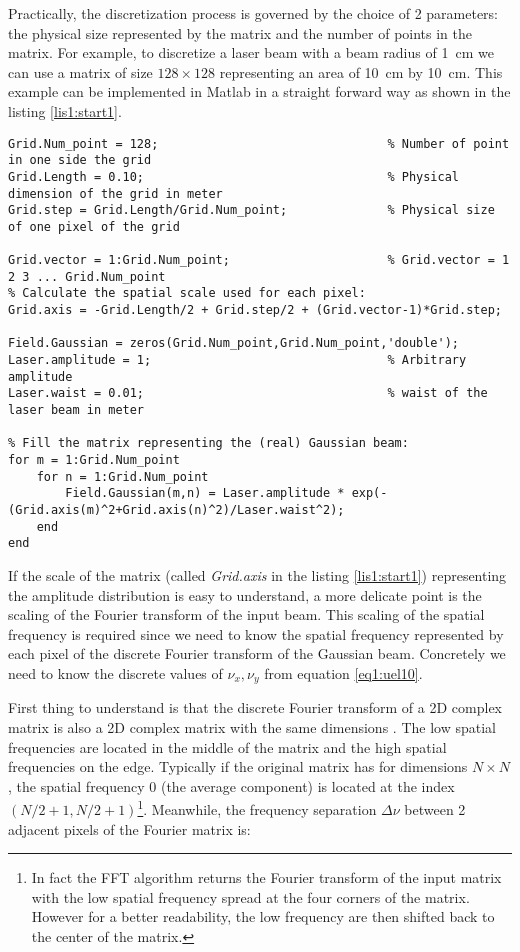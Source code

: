 Practically, the discretization process is governed by the choice of 2 parameters: the physical size represented by the matrix and the number of points in the matrix. For example, to discretize a laser beam with a beam radius of 1~cm we can use a matrix of size $128 \times 128$ representing an area of 10~cm by 10~cm. This example can be implemented in Matlab in a straight forward way as shown in the listing \ref{lis1:start1}.

\begin{lstlisting}[float=tp,caption=Discretization of a Gaussian beam\label{lis1:start1},frame=lines]
Grid.Num_point = 128;                                % Number of point in one side the grid
Grid.Length = 0.10;                                  % Physical dimension of the grid in meter
Grid.step = Grid.Length/Grid.Num_point;              % Physical size of one pixel of the grid

Grid.vector = 1:Grid.Num_point;                      % Grid.vector = 1 2 3 ... Grid.Num_point
% Calculate the spatial scale used for each pixel:
Grid.axis = -Grid.Length/2 + Grid.step/2 + (Grid.vector-1)*Grid.step;

Field.Gaussian = zeros(Grid.Num_point,Grid.Num_point,'double');
Laser.amplitude = 1;                                 % Arbitrary amplitude
Laser.waist = 0.01;                                  % waist of the laser beam in meter

% Fill the matrix representing the (real) Gaussian beam:
for m = 1:Grid.Num_point
    for n = 1:Grid.Num_point
        Field.Gaussian(m,n) = Laser.amplitude * exp(-(Grid.axis(m)^2+Grid.axis(n)^2)/Laser.waist^2);
    end
end

\end{lstlisting}

If the scale of the matrix (called \emph{Grid.axis} in the listing \ref{lis1:start1}) representing the amplitude distribution is easy to understand, a more delicate point is the scaling of the Fourier transform of the input beam. This scaling of the spatial frequency is required since we need to know the spatial frequency represented by each pixel of the discrete Fourier transform of the Gaussian beam. Concretely we need to know the discrete values of $\nu_x,\nu_y$ from equation \ref{eq1:uel10}.

First thing to understand is that the discrete Fourier transform of a 2D complex matrix is also a 2D complex matrix with the same dimensions \cite{Fourier2D}. The low spatial frequencies are located in the middle of the matrix and the high spatial frequencies on the edge. Typically if the original matrix has for dimensions $N \times N$, the spatial frequency 0 (the average component) is located at the index $(N/2+1,N/2+1)$\footnote{In fact the FFT algorithm returns the Fourier transform of the input matrix with the low spatial frequency spread at the four corners of the matrix. However for a better readability, the low frequency are then shifted back to the center of the matrix.}. Meanwhile, the frequency separation $\Delta \nu$ between 2 adjacent pixels of the Fourier matrix is:

